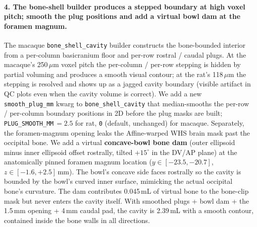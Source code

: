 \documentclass{compactarticle}
\begin{document}
\paragraph{4. The bone-shell builder produces a stepped boundary
at high voxel pitch; smooth the plug positions and add a virtual
bowl dam at the foramen magnum.} The macaque
\texttt{bone\_shell\_cavity} builder constructs the bone-bounded
interior from a per-column basicranium floor and per-row rostral /
caudal plugs. At the macaque's 250\,$\mu$m voxel pitch the
per-column / per-row stepping is hidden by partial voluming and
produces a smooth visual contour; at the rat's 118\,$\mu$m the
stepping is resolved and shows up as a jagged cavity boundary
(visible artifact in QC plots even when the cavity volume is
correct). We add a new \texttt{smooth\_plug\_mm} kwarg to
\texttt{bone\_shell\_cavity} that median-smooths the per-row /
per-column boundary positions in 2D before the plug masks are
built; \texttt{PLUG\_SMOOTH\_MM}\,$=2.5$ for rat,
\texttt{0} (default, unchanged) for macaque. Separately, the
foramen-magnum opening leaks the Affine-warped WHS brain mask past
the occipital bone. We add a virtual \textbf{concave-bowl bone dam}
(outer ellipsoid minus inner ellipsoid offset rostrally, tilted
$+15^\circ$ in the DV/AP plane) at the anatomically pinned foramen
magnum location ($y\in[-23.5, -20.7]$, $z\in[-1.6, +2.5]$\,mm).
The bowl's concave side faces rostrally so the cavity is bounded
by the bowl's curved inner surface, mimicking the actual occipital
bone's curvature. The dam contributes 0.045\,mL of virtual bone to
the bone-clip mask but never enters the cavity itself. With
smoothed plugs + bowl dam + the 1.5\,mm opening + 4\,mm caudal
pad, the cavity is 2.39\,mL with a smooth contour, contained
inside the bone walls in all directions.
\end{document}
